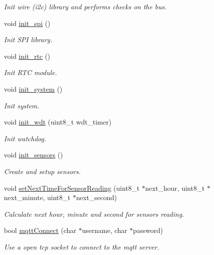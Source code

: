 \begin{DoxyCompactItemize}
\begin{DoxyCompactList}\small\item\em Init wire (i2c) library and performs checks on the bus. \end{DoxyCompactList}\item 
void \hyperlink{rmap_8ino_a8eb9780a3438ec02c70314744f91f3c7}{init\+\_\+spi} ()
\begin{DoxyCompactList}\small\item\em Init S\+PI library. \end{DoxyCompactList}\item 
void \hyperlink{rmap_8ino_ab985cc69f5f573113405b4f118c96d33}{init\+\_\+rtc} ()
\begin{DoxyCompactList}\small\item\em Init R\+TC module. \end{DoxyCompactList}\item 
void \hyperlink{rmap_8ino_afceb890a6ab9be73cc5481369538c705}{init\+\_\+system} ()
\begin{DoxyCompactList}\small\item\em Init system. \end{DoxyCompactList}\item 
void \hyperlink{rmap_8ino_a980e73df66b14b1190bc25da430a4f12}{init\+\_\+wdt} (uint8\+\_\+t wdt\+\_\+timer)
\begin{DoxyCompactList}\small\item\em Init watchdog. \end{DoxyCompactList}\item 
void \hyperlink{rmap_8ino_ac74850003fab6eb3269bfe043d0f939c}{init\+\_\+sensors} ()
\begin{DoxyCompactList}\small\item\em Create and setup sensors. \end{DoxyCompactList}\item 
void \hyperlink{rmap_8ino_ab79cac18f01c6dbc3ab4c8364c57ddcd}{set\+Next\+Time\+For\+Sensor\+Reading} (uint8\+\_\+t $\ast$next\+\_\+hour, uint8\+\_\+t $\ast$next\+\_\+minute, uint8\+\_\+t $\ast$next\+\_\+second)
\begin{DoxyCompactList}\small\item\em Calculate next hour, minute and second for sensors reading. \end{DoxyCompactList}\item 
bool \hyperlink{rmap_8ino_a9f5e5ca8c47d4536dd1805e89fbb7db2}{mqtt\+Connect} (char $\ast$username, char $\ast$password)
\begin{DoxyCompactList}\small\item\em Use a open tcp socket to connect to the mqtt server. \end{DoxyCompactList}\item 

\end{DoxyCompactItemize}

